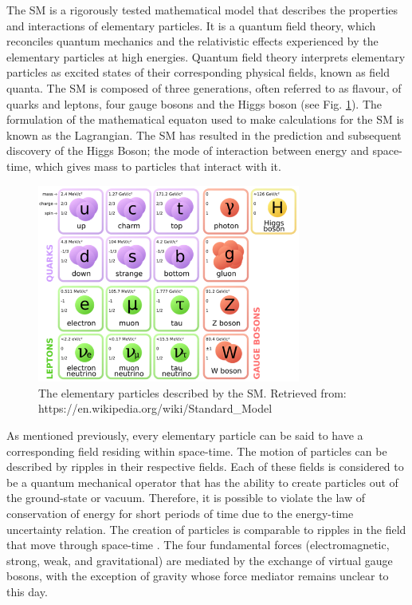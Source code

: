\documentclass[runningheads,a4paper]{llncs}
\begin{document}
The SM is a rigorously tested mathematical model that describes the properties and interactions of elementary particles. It is a quantum field theory, which reconciles quantum mechanics and the relativistic effects experienced by the elementary particles at high energies. Quantum field theory interprets elementary particles as excited states of their corresponding physical fields, known as field quanta. The SM is composed of three generations, often referred to as flavour, of quarks and leptons, four gauge bosons and the Higgs boson (see Fig. \ref{fig:standardmodel}). The formulation of the mathematical equaton used to make calculations for the SM is known as the Lagrangian. The SM has resulted in the prediction and subsequent discovery of the Higgs Boson; the mode of interaction between energy and space-time, which gives mass to particles that interact with it.\\

\begin{figure}
\centering
\includegraphics[height=6.5cm]{standardmodel}
\caption{The elementary particles described by the SM. Retrieved from: https://en.wikipedia.org/wiki/Standard\_Model}
\label{fig:standardmodel}
\end{figure}

\vspace{10mm}
As mentioned previously, every elementary particle can be said to have a corresponding field residing within space-time. The motion of particles can be described by ripples in their respective fields. Each of these fields is considered to be a quantum mechanical operator that has the ability to create particles out of the ground-state or vacuum. Therefore, it is possible to violate the law of conservation of energy for short periods of time due to the energy-time uncertainty relation. The creation of particles is comparable to ripples in the field that move through space-time \cite{raby1997neutrino}. The four fundamental forces (electromagnetic, strong, weak, and gravitational) are mediated by the exchange of virtual gauge bosons, with the exception of gravity whose force mediator remains unclear to this day.\\
\end{document}
